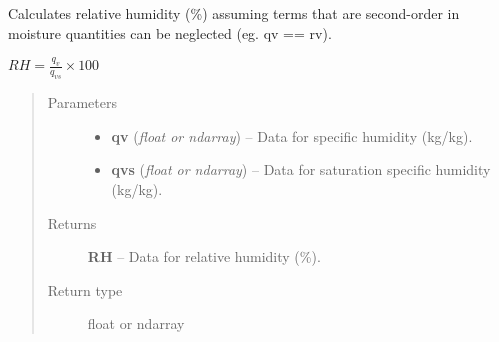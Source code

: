 \documentclass[letterpaper,10pt,english]{sphinxmanual}
\begin{document}

\begin{fulllineitems}
\label{atmos:atmos.equations.RH_from_qv_qvs_lwv}
Calculates relative humidity (\%) assuming terms that are second-order in
moisture quantities can be neglected (eg. qv == rv).

\(RH = \frac{q_{v}}{q_{vs}} \times 100\)
\begin{quote}\begin{description}
\item[{Parameters}] \leavevmode\begin{itemize}
\item {} 
\textbf{qv} (\emph{float or ndarray}) -- Data for specific humidity (kg/kg).

\item {} 
\textbf{qvs} (\emph{float or ndarray}) -- Data for saturation specific humidity (kg/kg).

\end{itemize}

\item[{Returns}] \leavevmode
\textbf{RH} --
Data for relative humidity (\%).

\item[{Return type}] \leavevmode
float or ndarray

\end{description}\end{quote}

\end{fulllineitems}

\end{document}
